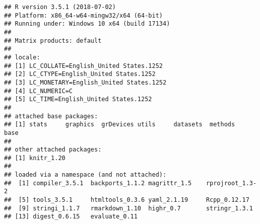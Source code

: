 \documentclass[]{article}
\begin{document}
\begin{verbatim}
## R version 3.5.1 (2018-07-02)
## Platform: x86_64-w64-mingw32/x64 (64-bit)
## Running under: Windows 10 x64 (build 17134)
## 
## Matrix products: default
## 
## locale:
## [1] LC_COLLATE=English_United States.1252 
## [2] LC_CTYPE=English_United States.1252   
## [3] LC_MONETARY=English_United States.1252
## [4] LC_NUMERIC=C                          
## [5] LC_TIME=English_United States.1252    
## 
## attached base packages:
## [1] stats     graphics  grDevices utils     datasets  methods   base     
## 
## other attached packages:
## [1] knitr_1.20
## 
## loaded via a namespace (and not attached):
##  [1] compiler_3.5.1  backports_1.1.2 magrittr_1.5    rprojroot_1.3-2
##  [5] tools_3.5.1     htmltools_0.3.6 yaml_2.1.19     Rcpp_0.12.17   
##  [9] stringi_1.1.7   rmarkdown_1.10  highr_0.7       stringr_1.3.1  
## [13] digest_0.6.15   evaluate_0.11
\end{verbatim}
\end{document}
